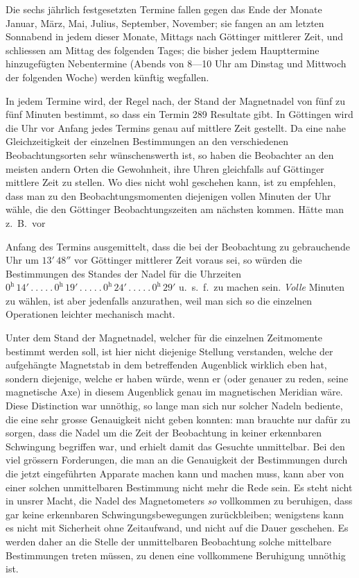Die sechs jährlich festgesetzten Termine fallen gegen das Ende der Monate Januar, März, Mai, Julius, September, November; sie fangen an am letzten Sonnabend in jedem dieser Monate, Mittags nach Göttinger mittlerer Zeit, und schliessen am Mittag des folgenden Tages; die bisher jedem Haupttermine hinzugefügten Nebentermine (Abends von 8—10 Uhr am Dinstag und Mittwoch der folgenden Woche) werden künftig wegfallen.

In jedem Termine wird, der Regel nach, der Stand der Magnetnadel von fünf zu fünf Minuten bestimmt, so dass ein Termin 289 Resultate gibt. In Göttingen wird die Uhr vor Anfang jedes Termins genau auf mittlere Zeit gestellt. Da eine nahe Gleichzeitigkeit der einzelnen Bestimmungen an den verschiedenen Beobachtungsorten sehr wünschenswerth ist, so haben die Beobachter an den meisten andern Orten die Gewohnheit, ihre Uhren gleichfalls auf Göttinger mittlere Zeit zu stellen. Wo dies nicht wohl geschehen kann, ist zu empfehlen, dass man zu den Beobachtungsmomenten diejenigen vollen Minuten der Uhr wähle, die den Göttinger Beobachtungszeiten am nächsten kommen. Hätte man z.\ B.\ vor
\par\clearpage
{}
\noindent Anfang des Termins ausgemittelt, dass die bei der Beobachtung zu gebrauchende Uhr um $13'\,48''$ vor Göttinger mittlerer Zeit voraus sei, so würden die Bestimmungen des Standes der Nadel für die Uhrzeiten $0^{\mathrm h}\,14'\,.\ .\ .\ .\ .\allowbreak\,0^{\mathrm h}\,19'\,.\ .\ .\ .\ .\allowbreak\,0^{\mathrm h}\,24'\,.\ .\ .\ .\ .\allowbreak\,0^{\mathrm h}\,29'$ u.\ s.\ f.\ zu machen sein. \textit{Volle} Minuten zu wählen, ist aber jedenfalls anzurathen, weil man sich so die einzelnen Operationen leichter mechanisch macht.

Unter dem Stand der Magnetnadel, welcher für die einzelnen Zeitmomente bestimmt werden soll, ist hier nicht diejenige Stellung verstanden, welche der aufgehängte Magnetstab in dem betreffenden Augenblick wirklich eben hat, sondern diejenige, welche er haben würde, wenn er (oder genauer zu reden, seine magnetische Axe) in diesem Augenblick genau im magnetischen Meridian wäre. Diese Distinction war unnöthig, so lange man sich nur solcher Nadeln bediente, die eine sehr grosse Genauigkeit nicht geben konnten: man brauchte nur dafür zu sorgen, dass die Nadel um die Zeit der Beobachtung in keiner erkennbaren Schwingung begriffen war, und erhielt damit das Gesuchte unmittelbar. Bei den viel grössern Forderungen, die man an die Genauigkeit der Bestimmungen durch die jetzt eingeführten Apparate machen kann und machen muss, kann aber von einer solchen unmittelbaren Bestimmung nicht mehr die Rede sein. Es steht nicht in unsrer Macht, die Nadel des Magnetometers \textit{so} vollkommen zu beruhigen, dass gar keine erkennbaren Schwingungsbewegungen zurückbleiben; wenigstens kann es nicht mit Sicherheit ohne Zeitaufwand, und nicht auf die Dauer geschehen. Es werden daher an die Stelle der unmittelbaren Beobachtung solche mittelbare Bestimmungen treten müssen, zu denen eine vollkommene Beruhigung unnöthig ist.

